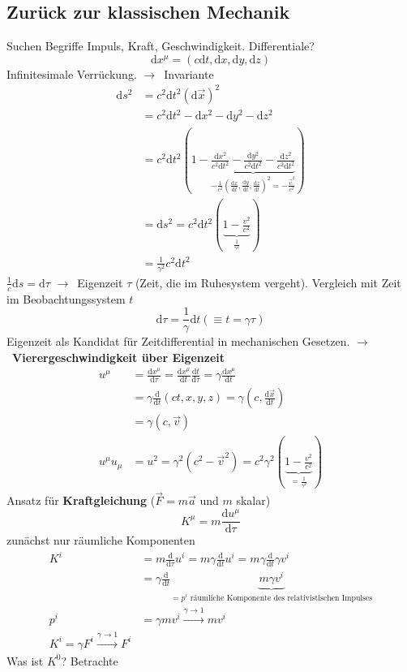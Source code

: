 \documentclass[oneside]{book}
\theoremstyle{definition}
\newcommand{\conseq}{$\rightarrow$~}
\renewcommand{\d}{\mathrm d}
\newcommand{\dd}[1]{\frac{\d}{\d #1}}
\newcommand{\ddd}[2]{\frac{\d #1}{\d #2}}
\begin{document}
\subsection{Zurück zur klassischen Mechanik}
Suchen Begriffe Impuls, Kraft, Geschwindigkeit. Differentiale?
$$\d x^\mu = (c \d t, \d x, \d y, \d z)$$
Infinitesimale Verrückung.
\conseq Invariante
\begin{align*}
 \d s^2  &= c^2 \d t^2 (\d \vec{x})^2\\
 & = c^2 \d t^2 - \d x^2 - \d y^2 - \d z^2\\
 & = c^2 \d t^2 (1 - \underbrace{\frac{\d x^2}{c^2 \d t^2} - \frac{\d y^2}{c^2 \d t^2} - \frac{\d z^2}{c^2 \d t^2}}_{- \frac{1}{c^2} (\ddd x t, \ddd y t, \ddd z t)^2 = - \frac{\vec{v}^2}{c^2}})\\
 & = \d s^2 = c^2 \d t^2 (\underbrace{1 - \frac{v^2}{c^2}}_{\frac{1}{\gamma^2}})\\
 & = \frac{1}{\gamma^2} c^2 \d t^2
\end{align*}
$\frac{1}{c} \d s = \d \tau$ \conseq Eigenzeit $\tau$ (Zeit, die im Ruhesystem vergeht).
Vergleich mit Zeit im Beobachtungssystem $t$
$$\d \tau = \frac{1}{\gamma} \d t (\equiv t = \gamma \tau)$$
Eigenzeit als Kandidat für Zeitdifferential in mechanischen Gesetzen.
\conseq \textbf{Vierergeschwindigkeit über Eigenzeit}
\begin{align*}
	u^\mu &= \ddd{x^\mu}{\tau} = \ddd{x^\mu}{t} \ddd t \tau = \gamma \ddd{x^\mu}{t}\\
	&= \gamma \dd t (c t, x, y, z) = \gamma (c, \ddd{\vec{x}}{t})\\
	&= \gamma (c, \vec{v})\\
	u^\mu u_\mu &= u^2 = \gamma^2 (c^2 - \vec{v}^2) = c^2 \gamma^2 (\underbrace{1 - \frac{v^2}{c^2}}_{= \frac{1}{\gamma^2}})
\end{align*}
Ansatz für \textbf{Kraftgleichung} ($\vec{F} = m \vec{a}$ und $m$ skalar)
$$K^\mu = m \ddd{u^\mu}{\tau}$$
zunächst nur räumliche Komponenten
\begin{align*}
	K^i &= m \dd \tau u^i = m \gamma \dd t u^i = m \gamma \dd t \gamma v^i\\
	&= \gamma \dd t \underbrace{m \gamma v^i}_{= p^i \text{~räumliche Komponente des relativistischen Impulses}}\\
	p^i &= \gamma m v^i \xrightarrow{\gamma \to 1} m v^i\\
	K^i = \gamma F^i \xrightarrow{\gamma \to 1} F^i
\end{align*}
Was ist $K^0$? Betrachte
\end{document}
